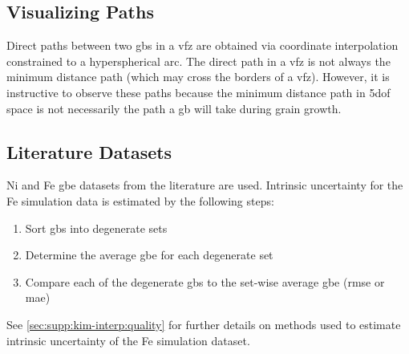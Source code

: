 \documentclass[final,twocolumn,12pt]{elsarticle}
\begin{document}
    
	\subsection{Visualizing  Paths} \label{sec:methods:path}
	Direct paths between two \glspl{gb} in a \gls{vfz} are obtained via coordinate interpolation constrained to a hyperspherical arc. The direct path in a \gls{vfz} is not always the minimum distance path (which may cross the borders of a \gls{vfz}). However, it is instructive to observe these paths because the minimum distance path in \gls{5dof} space is not necessarily the path a \gls{gb} will take during grain growth.
	
	\subsection{Literature Datasets}
	\label{sec:methods:litdata}
	Ni \cite{olmstedSurveyComputedGrain2009} and Fe \cite{kimPhasefieldModeling3D2014} \gls{gbe} datasets from the literature are used. Intrinsic uncertainty for the Fe simulation data is estimated by the following steps:
	\begin{enumerate}
	    \item Sort \glspl{gb} into degenerate sets
	    \item Determine the average \gls{gbe} for each degenerate set
	    \item Compare each of the degenerate \glspl{gb} to the set-wise average \gls{gbe} (\gls{rmse} or \gls{mae})
	\end{enumerate}
	See \cref{sec:supp:kim-interp:quality} for further details on methods used to estimate intrinsic uncertainty of the Fe simulation dataset.
	
\end{document}
